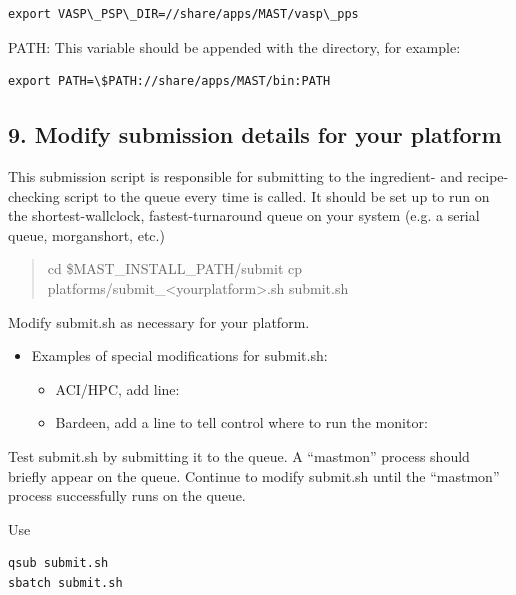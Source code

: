 \documentclass[letterpaper,10pt,english]{sphinxmanual}
\begin{document}
\begin{Verbatim}[commandchars=\\\{\}]
export VASP\_PSP\_DIR=//share/apps/MAST/vasp\_pps
\end{Verbatim}

PATH: This variable should be appended with the  directory, for example:

\begin{Verbatim}[commandchars=\\\{\}]
export PATH=\$PATH://share/apps/MAST/bin:PATH
\end{Verbatim}


\subsection{9. Modify submission details for your platform}
\label{1_0_installation:modify-submission-details-for-your-platform}
This submission script is responsible for submitting to the ingredient- and recipe-checking script to the queue every time  is called.
It should be set up to run on the shortest-wallclock, fastest-turnaround queue on your system (e.g. a serial queue, morganshort, etc.)
\begin{quote}

cd \$MAST\_INSTALL\_PATH/submit
cp platforms/submit\_\textless{}yourplatform\textgreater{}.sh submit.sh
\end{quote}

Modify submit.sh as necessary for your platform.
\begin{itemize}
\item {} 
Examples of special modifications for submit.sh:
\begin{itemize}
\item {} 
ACI/HPC, add line: 

\item {} 
Bardeen, add a line to tell control where to run the monitor: 

\end{itemize}

\end{itemize}

Test submit.sh by submitting it to the queue. A ``mastmon'' process should briefly appear on the queue. Continue to modify submit.sh until the ``mastmon'' process successfully runs on the queue.

Use

\begin{Verbatim}[commandchars=\\\{\}]
qsub submit.sh
sbatch submit.sh
\end{Verbatim}
\end{document}
